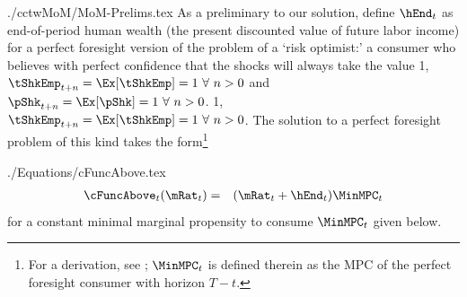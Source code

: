\documentclass[titlepage]{\econtex}
\newcommand{\pShkOn}{\ifthenelse{\boolean{pShkVersion}}}
\begin{document}
\begin{verbatimwrite}{./cctwMoM/MoM-Prelims.tex}
As a preliminary to our solution, define $\hEnd_{t}$ as
end-of-period human wealth (the present discounted value
of future labor income) for a perfect foresight version of the problem
of a `risk optimist:' a consumer who believes with perfect confidence
that the shocks will always take the value 
\pShkOn
{1, $\tShkEmp_{t+n} = \Ex[\tShkEmp]=1~\forall~n>0$ and $\pShk_{t+n} = \Ex[\pShk]=1~\forall~n>0$.}
{1, $\tShkEmp_{t+n} = \Ex[\tShkEmp]=1~\forall~n>0$.}
The solution to a perfect foresight problem of this kind takes the
form\footnote{For a derivation, see \cite{BufferStockTheory}; $\MinMPC_{t}$ is defined therein as the MPC of the perfect foresight consumer with horizon $T-t$.}
\end{verbatimwrite}

\begin{verbatimwrite}{./Equations/cFuncAbove.tex}
\begin{eqnarray}
  \cFuncAbove_{t}(\mRat_{t}) & = & (\mRat_{t} + \hEnd_{t})\MinMPC_{t} \label{eq:cFuncAbove}
\end{eqnarray}
for a constant minimal marginal propensity to consume $\MinMPC_{t}$ given below.
\end{verbatimwrite}

\end{document}
